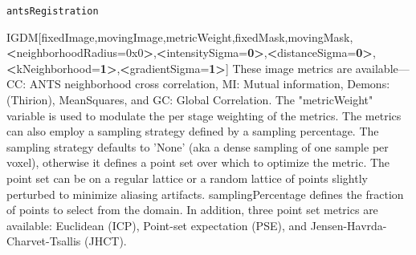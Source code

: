 \documentclass[ignorenonframetext,]{beamer}
\newenvironment{Shaded}{\begin{snugshade}}{\end{snugshade}}
\newcommand{\StringTok}[1]{\textcolor[rgb]{0.31,0.60,0.02}{#1}}
\newcommand{\FunctionTok}[1]{\textcolor[rgb]{0.00,0.00,0.00}{#1}}
\newcommand{\OperatorTok}[1]{\textcolor[rgb]{0.81,0.36,0.00}{\textbf{#1}}}
\newcommand{\ExtensionTok}[1]{#1}
\newcommand{\NormalTok}[1]{#1}
\begin{document}
\begin{frame}[fragile]{\texttt{antsRegistration}}
\begin{Shaded}
\begin{Highlighting}[]
                  \ExtensionTok{IGDM}\NormalTok{[fixedImage,movingImage,metricWeight,fixedMask,movingMask,}\OperatorTok{<}\NormalTok{neighborhoodRadius=0x0}\OperatorTok{>}\NormalTok{,}\OperatorTok{<}\NormalTok{intensitySigma=}\OperatorTok{0>}\NormalTok{,}\OperatorTok{<}\NormalTok{distanceSigma=}\OperatorTok{0>}\NormalTok{,}\OperatorTok{<}\NormalTok{kNeighborhood=}\OperatorTok{1>}\NormalTok{,}\OperatorTok{<}\NormalTok{gradientSigma=}\OperatorTok{1>}\NormalTok{]}
          \ExtensionTok{These}\NormalTok{ image metrics are available--- CC: ANTS neighborhood cross correlation,}
          \ExtensionTok{MI}\NormalTok{: Mutual information, Demons: (Thirion), }\ExtensionTok{MeanSquares}\NormalTok{, and GC: Global}
          \ExtensionTok{Correlation.}\NormalTok{ The }\StringTok{"metricWeight"}\NormalTok{ variable is used to modulate the per stage}
          \ExtensionTok{weighting}\NormalTok{ of the metrics. The metrics can also employ a sampling strategy}
          \ExtensionTok{defined}\NormalTok{ by a sampling percentage. The sampling strategy defaults to }\StringTok{'None'}\NormalTok{ (aka}
          \ExtensionTok{a}\NormalTok{ dense sampling of one sample per voxel), }\ExtensionTok{otherwise}\NormalTok{ it defines a point set over}
          \FunctionTok{which}\NormalTok{ to optimize the metric. The point set can be on a regular lattice or a}
          \ExtensionTok{random}\NormalTok{ lattice of points slightly perturbed to minimize aliasing artifacts.}
          \ExtensionTok{samplingPercentage}\NormalTok{ defines the fraction of points to select from the domain. In}
          \ExtensionTok{addition}\NormalTok{, three point set metrics are available: Euclidean (ICP), }\ExtensionTok{Point-set}
          \ExtensionTok{expectation}\NormalTok{ (PSE), }\ExtensionTok{and}\NormalTok{ Jensen-Havrda-Charvet-Tsallis (JHCT)}\ExtensionTok{.}


\end{Highlighting}
\end{Shaded}
\end{frame}
\end{document}
